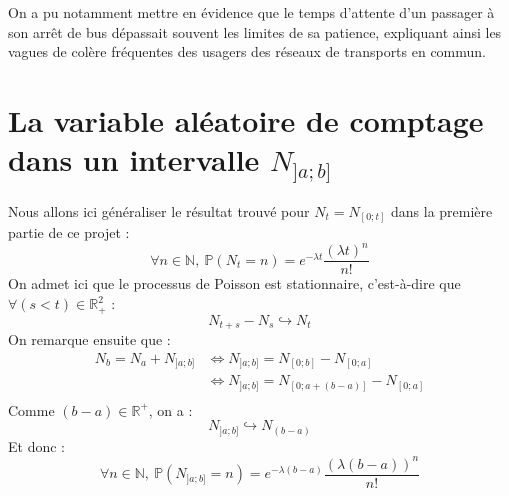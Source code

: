 \documentclass[a4paper, titlepage]{livret} %
\begin{document}
		On a pu notamment mettre en évidence que le temps d'attente d'un passager à son arrêt de bus dépassait souvent les limites de sa patience, expliquant ainsi les vagues de colère fréquentes des usagers des réseaux de transports en commun.


	\appendix

	\chapter{La variable aléatoire de comptage dans un intervalle $N_{]a;b]}$}
		Nous allons ici généraliser le résultat trouvé pour $N_{t} = N_{[0;t]}$ dans la première partie de ce projet :
		\[
			\forall n \in \mathbb{N}, \ \mathbb{P}(N_{t} = n) = e^{-\lambda t}\frac{(\lambda t)^{n}}{n!}
		\]
		On admet ici que le processus de Poisson est stationnaire, c'est-à-dire que $\forall (s < t) \in \mathbb{R}_{+}^{2}$ :
		\[
			N_{t+s} - N_{s} \hookrightarrow N_{t}
		\]
		On remarque ensuite que : 
		\[\begin{aligned}
			N_{b} = N_{a} + N_{]a;b]} & \Leftrightarrow N_{]a;b]} = N_{[0;b]} - N_{[0;a]}\\
									  & \Leftrightarrow N_{]a;b]} = N_{[0;a + (b -a)]} - N_{[0;a]}\\
		\end{aligned}\]
		Comme $(b-a) \in \mathbb{R}^{+}$, on a :
		\[\boxed{
			N_{]a;b]} \hookrightarrow N_{(b-a)}
		}\]
		Et donc :
		\[\boxed{
			\forall n \in \mathbb{N}, \ \mathbb{P}(N_{]a;b] } = n) = e^{-\lambda (b-a)}\frac{(\lambda (b-a))^{n}}{n!}
		}\]
\end{document}
